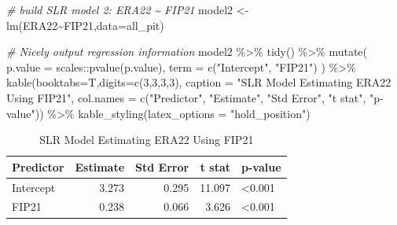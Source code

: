 \documentclass[
  11pt,
]{book}
\newenvironment{Shaded}{\begin{snugshade}}{\end{snugshade}}
\newcommand{\AttributeTok}[1]{\textcolor[rgb]{0.77,0.63,0.00}{#1}}
\newcommand{\CommentTok}[1]{\textcolor[rgb]{0.56,0.35,0.01}{\textit{#1}}}
\newcommand{\DecValTok}[1]{\textcolor[rgb]{0.00,0.00,0.81}{#1}}
\newcommand{\FunctionTok}[1]{\textcolor[rgb]{0.00,0.00,0.00}{#1}}
\newcommand{\NormalTok}[1]{#1}
\newcommand{\OtherTok}[1]{\textcolor[rgb]{0.56,0.35,0.01}{#1}}
\newcommand{\SpecialCharTok}[1]{\textcolor[rgb]{0.00,0.00,0.00}{#1}}
\newcommand{\StringTok}[1]{\textcolor[rgb]{0.31,0.60,0.02}{#1}}
\theoremstyle{definition}
\theoremstyle{definition}
\theoremstyle{definition}
\theoremstyle{definition}
\theoremstyle{remark}
\begin{document}
\newpage

\begin{Shaded}
\begin{Highlighting}[]
\CommentTok{\# build SLR model 2: ERA22 \textasciitilde{} FIP21}
\NormalTok{model2 }\OtherTok{\textless{}{-}} \FunctionTok{lm}\NormalTok{(ERA22}\SpecialCharTok{\textasciitilde{}}\NormalTok{FIP21,}\AttributeTok{data=}\NormalTok{all\_pit)}

\CommentTok{\# Nicely output regression information}
\NormalTok{model2 }\SpecialCharTok{\%\textgreater{}\%} \FunctionTok{tidy}\NormalTok{() }\SpecialCharTok{\%\textgreater{}\%}
  \FunctionTok{mutate}\NormalTok{(}
    \AttributeTok{p.value =}\NormalTok{ scales}\SpecialCharTok{::}\FunctionTok{pvalue}\NormalTok{(p.value),}
    \AttributeTok{term =} \FunctionTok{c}\NormalTok{(}\StringTok{"Intercept"}\NormalTok{, }\StringTok{"FIP21"}\NormalTok{)}
\NormalTok{  ) }\SpecialCharTok{\%\textgreater{}\%}
  \FunctionTok{kable}\NormalTok{(}\AttributeTok{booktabs=}\NormalTok{T,}\AttributeTok{digits=}\FunctionTok{c}\NormalTok{(}\DecValTok{3}\NormalTok{,}\DecValTok{3}\NormalTok{,}\DecValTok{3}\NormalTok{,}\DecValTok{3}\NormalTok{), }
        \AttributeTok{caption =} \StringTok{"SLR Model Estimating ERA22 Using FIP21"}\NormalTok{,}
        \AttributeTok{col.names =} \FunctionTok{c}\NormalTok{(}\StringTok{"Predictor"}\NormalTok{, }\StringTok{"Estimate"}\NormalTok{, }\StringTok{"Std Error"}\NormalTok{, }\StringTok{"t stat"}\NormalTok{, }\StringTok{"p{-}value"}\NormalTok{)) }\SpecialCharTok{\%\textgreater{}\%}
  \FunctionTok{kable\_styling}\NormalTok{(}\AttributeTok{latex\_options =} \StringTok{"hold\_position"}\NormalTok{)}
\end{Highlighting}
\end{Shaded}

\begin{table}[!h]

\caption{\label{tab:unnamed-chunk-221}SLR Model Estimating ERA22 Using FIP21}
\centering
\begin{tabular}[t]{lrrrl}
\toprule
Predictor & Estimate & Std Error & t stat & p-value\\
\midrule
Intercept & 3.273 & 0.295 & 11.097 & <0.001\\
FIP21 & 0.238 & 0.066 & 3.626 & <0.001\\
\bottomrule
\end{tabular}
\end{table}
\end{document}
